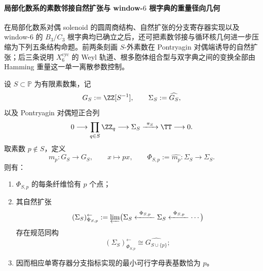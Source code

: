 \paragraph{局部化数系的素数邻接自然扩张与 window-\texorpdfstring{$6$}{6} 根字典的重量径向几何}
在局部化数系对偶 solenoid 的圆周商结构、自然扩张的分支寄存器实现以及 window-\(6\) 的 \(B_3/C_3\) 根字典均已确立之后，还可把素数邻接与循环核几何进一步压缩为下列五条结构命题。前两条刻画 \(S\)-外素数在 Pontryagin 对偶端诱导的自然扩张；后三条说明 \(X_6^{\mathrm{cyc}}\) 的 Weyl 轨道、根多胞体组合型与双字典之间的变换全部由 Hamming 重量这一单一离散参数控制。

\begin{theorem}\label{thm:xi-time-part62dea-localized-prime-adjunction-natural-extension}
设 \(S\subset \mathbb P\) 为有限素数集，记
\[
G_S:=\ZZ[S^{-1}],
\qquad
\Sigma_S:=\widehat{G_S},
\]
以及 Pontryagin 对偶短正合列
\[
0\longrightarrow \prod_{q\in S}\ZZ_q
\longrightarrow \Sigma_S
\xrightarrow{\ \pi_S\ }
\TT
\longrightarrow 0.
\]
取素数 \(p\notin S\)，定义
\[
m_p:G_S\to G_S,
\qquad
x\longmapsto px,
\qquad
\Phi_{S,p}:=\widehat{m_p}:\Sigma_S\to\Sigma_S.
\]
则有：
\begin{enumerate}
  \item \(\Phi_{S,p}\) 的每条纤维恰有 \(p\) 个点；
  \item 其自然扩张
  \[
  (\Sigma_S)^{\leftarrow}_{\Phi_{S,p}}
  :=
  \varprojlim\bigl(
  \Sigma_S\xleftarrow{\ \Phi_{S,p}\ }
  \Sigma_S\xleftarrow{\ \Phi_{S,p}\ }\cdots
  \bigr)
  \]
  存在规范同构
  \[
  (\Sigma_S)^{\leftarrow}_{\Phi_{S,p}}
  \cong
  \widehat{G_{S\cup\{p\}}};
  \]
  \item 因而相应单寄存器分支指标实现的最小可行字母表基数恰为 \(p\)。
\end{enumerate}
\end{theorem}
